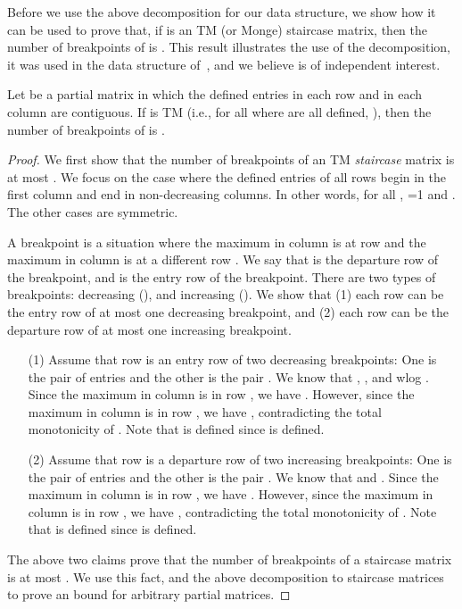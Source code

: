 \documentclass{llncs}
\begin{document}
Before we use the above decomposition for our data structure, we show how it can be used  to prove that, if  is an  TM (or Monge) staircase
matrix, then the number of breakpoints of  is
. This result illustrates the use of the decomposition, it was used in the data structure of~\cite{ourICALP}, and we believe is of independent interest.


\begin{theorem}\label{lemma:partial-breakpoints}
Let  be a partial  matrix in which the defined entries in each row
and in each column are
contiguous.
If  is TM (i.e., for all  where
 are all defined, ), then the number of breakpoints of  is .
\end{theorem}
\begin{proof}
We first show that the number of breakpoints of an  TM {\em staircase} matrix is at
most .
We focus on the case where the defined entries of all rows begin in the first column and end in non-decreasing columns. In other words, for all , =1 and . The other cases are symmetric. 

A breakpoint is a situation where the maximum in column  is at row
 and the maximum in column  is at a different row .
We say that  is the departure row of the breakpoint, and  is
the  entry row of the breakpoint.
There are two types of breakpoints: decreasing (), and
increasing  ().
We show that 
(1) each row can be the entry row of at most one decreasing breakpoint, and (2) each row can be the
departure row of at most one increasing breakpoint. 
\begin{enumerate}
\item[(1)] Assume that row  is an entry row of two decreasing
  breakpoints:  One is the pair of entries  and
  the other is the pair  . We know that
  , , and wlog . 
Since the maximum in column  is in row , we have
.
However, since the maximum in column  is in row , we have
, contradicting the total monotonicity of
. Note that  is defined since  is defined.


\item[(2)]
Assume that row  is a departure row of two increasing breakpoints:
One is the pair of entries  and the other is
the pair  . We know that  and
. 
Since the maximum in column  is in row , we have
.
However, since the maximum in column  is in row , we have
, contradicting the total monotonicity of
. Note that  is defined since  is defined.
\end{enumerate} 

The above two claims prove that the number of breakpoints of a staircase matrix is at
most .
We use this fact, and the above decomposition to staircase matrices to prove an  bound for arbitrary partial matrices.



\end{proof}
\end{document}
